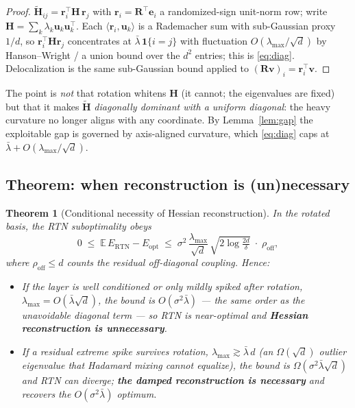 \documentclass[11pt]{article}
\newtheorem{theorem}{Theorem}
\theoremstyle{remark}
\newcommand{\E}{\mathbb{E}}
\newcommand{\Hm}{\bm H}
\begin{document}
\begin{proof}
$\tilde{\Hm}_{ij}=\bm r_i^{\!\top}\Hm\,\bm r_j$ with $\bm r_i=\bm R^{\!\top}\bm e_i$
a randomized-sign unit-norm row; write $\Hm=\sum_k\lambda_k\bm u_k\bm u_k^{\!\top}$.
Each $\langle\bm r_i,\bm u_k\rangle$ is a Rademacher sum with sub-Gaussian proxy
$1/d$, so $\bm r_i^{\!\top}\Hm\bm r_j$ concentrates at
$\bar\lambda\,\mathbf 1\{i{=}j\}$ with fluctuation
$O(\lambda_{\max}/\sqrt d)$ by Hanson--Wright / a union bound over the $d^2$
entries; this is \eqref{eq:diag}. Delocalization is the same sub-Gaussian bound
applied to $(\bm R\bm v)_i=\bm r_i^{\!\top}\bm v$.
\end{proof}

The point is \emph{not} that rotation whitens $\Hm$ (it cannot; the eigenvalues
are fixed) but that it makes $\tilde{\Hm}$ \emph{diagonally dominant with a
uniform diagonal}: the heavy curvature no longer aligns with any coordinate. By
Lemma~\ref{lem:gap} the exploitable gap is governed by axis-aligned curvature,
which \eqref{eq:diag} caps at $\bar\lambda+O(\lambda_{\max}/\sqrt d)$.

\subsection{Theorem: when reconstruction is (un)necessary}

\begin{theorem}[Conditional necessity of Hessian reconstruction]
\label{thm:cond}
In the rotated basis, the RTN suboptimality obeys
\begin{equation}
\label{eq:cond}
0\;\le\;\E\,E_{\mathrm{RTN}}-E_{\mathrm{opt}}
   \;\le\; \sigma^2\,\frac{\lambda_{\max}}{\sqrt d}\,
           \sqrt{2\log\tfrac{2d}{\delta}}\;\cdot\;\rho_{\mathrm{off}},
\end{equation}
where $\rho_{\mathrm{off}}\le d$ counts the residual off-diagonal coupling.
Hence:
\begin{itemize}
\item[(i)] If the layer is well conditioned or only mildly spiked after
rotation, $\lambda_{\max}=O(\bar\lambda\sqrt d)$, the bound is
$O(\sigma^2\bar\lambda)$ --- the same order as the unavoidable diagonal term
--- so RTN is near-optimal and \textbf{Hessian reconstruction is unnecessary}.
\item[(ii)] If a residual extreme spike survives rotation,
$\lambda_{\max}\gtrsim\bar\lambda\,d$ (an $\Omega(\sqrt d)$ outlier eigenvalue
that Hadamard mixing cannot equalize), the bound is
$\Omega(\sigma^2\bar\lambda\sqrt d)$ and RTN can diverge; \textbf{the damped
reconstruction is necessary} and recovers the $O(\sigma^2\bar\lambda)$ optimum.
\end{itemize}
\end{theorem}
\end{document}
